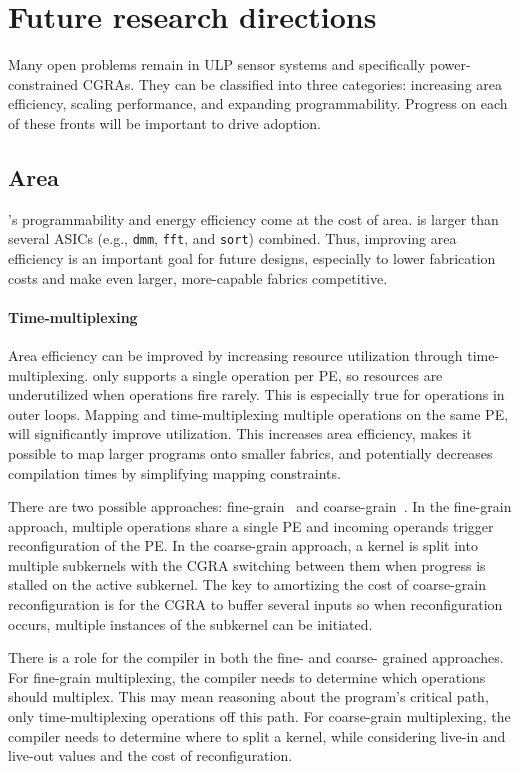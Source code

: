 \section{Future research directions}
Many open problems remain in ULP sensor systems and specifically power-constrained CGRAs.
% 
They can be classified into three categories: increasing area efficiency, scaling performance, and expanding programmability.
% 
Progress on each of these fronts will be important to drive adoption.

\subsection{Area}
\riptide's programmability and energy efficiency come at the cost of area.
% 
\riptide is larger than several ASICs (e.g., {\tt dmm}, {\tt fft}, and {\tt sort}) combined.
% 
Thus, improving area efficiency is an important goal for future designs, especially to lower fabrication costs and make even larger, more-capable fabrics competitive.

\paragraph{Time-multiplexing}
Area efficiency can be improved by increasing resource utilization through time-multiplexing.
% 
\riptide only supports a single operation per PE, so resources are underutilized when operations fire rarely.
% 
This is especially true for operations in outer loops.
% 
Mapping and time-multiplexing multiple operations on the same PE, will significantly improve utilization.
% 
This increases area efficiency, makes it possible to map larger programs onto smaller fabrics, and potentially decreases compilation times by simplifying mapping constraints.

There are two possible approaches: fine-grain~\cite{weng2020hybrid} and coarse-grain~\cite{nguyen2021fifer}.
% 
In the fine-grain approach, multiple operations share a single PE and incoming operands trigger reconfiguration of the PE.
% 
In the coarse-grain approach, a kernel is split into multiple subkernels with the CGRA switching between them when progress is stalled on the active subkernel.
% 
The key to amortizing the cost of coarse-grain reconfiguration
is for the CGRA to buffer several inputs so when reconfiguration occurs, multiple instances of the subkernel can be initiated.

There is a role for the compiler in both the fine- and coarse- grained approaches.
% 
For fine-grain multiplexing, the compiler needs to determine which operations should multiplex.
% 
This may mean reasoning about the program's critical path, only time-multiplexing operations off this path.
% 
For coarse-grain multiplexing, the compiler needs to determine where to split a kernel, while considering live-in and live-out values and the cost of reconfiguration.

